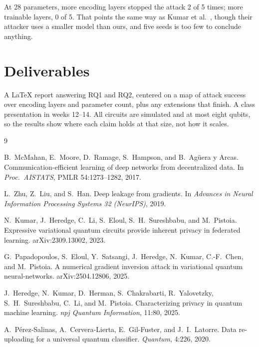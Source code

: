 \documentclass[11pt]{article}
\begin{document}
At 28 parameters, more encoding layers stopped the attack 2 of 5 times; more trainable layers,
0 of 5. That points the same way as Kumar et al.~\cite{kumar2023}, though their attacker uses a
smaller model than ours, and five seeds is too few to conclude anything.

\section*{Deliverables}

A LaTeX report answering RQ1 and RQ2, centered on a map of attack success over encoding layers
and parameter count, plus any extensions that finish. A class presentation in weeks 12--14.
All circuits are simulated and at most eight qubits, so the results show where each claim holds
at that size, not how it scales.

\begin{thebibliography}{9}
\setlength{\itemsep}{2pt}

B.~McMahan, E.~Moore, D.~Ramage, S.~Hampson, and B.~Ag\"uera y Arcas.
Communication-efficient learning of deep networks from decentralized data.
In \emph{Proc.\ AISTATS}, PMLR 54:1273--1282, 2017.

L.~Zhu, Z.~Liu, and S.~Han.
Deep leakage from gradients.
In \emph{Advances in Neural Information Processing Systems 32 (NeurIPS)}, 2019.

N.~Kumar, J.~Heredge, C.~Li, S.~Eloul, S.~H.~Sureshbabu, and M.~Pistoia.
Expressive variational quantum circuits provide inherent privacy in federated learning.
arXiv:2309.13002, 2023.

G.~Papadopoulos, S.~Eloul, Y.~Satsangi, J.~Heredge, N.~Kumar, C.-F.~Chen, and M.~Pistoia.
A numerical gradient inversion attack in variational quantum neural-networks.
arXiv:2504.12806, 2025.

J.~Heredge, N.~Kumar, D.~Herman, S.~Chakrabarti, R.~Yalovetzky, S.~H.~Sureshbabu, C.~Li, and
M.~Pistoia.
Characterizing privacy in quantum machine learning.
\emph{npj Quantum Information}, 11:80, 2025.

A.~P\'erez-Salinas, A.~Cervera-Lierta, E.~Gil-Fuster, and J.~I.~Latorre.
Data re-uploading for a universal quantum classifier.
\emph{Quantum}, 4:226, 2020.

\end{thebibliography}
\end{document}
